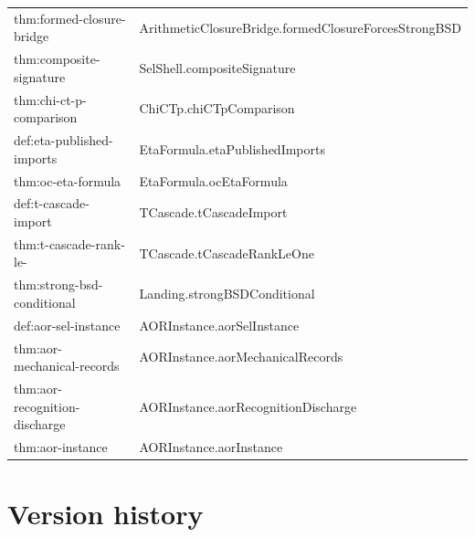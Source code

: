 \documentclass[11pt]{article}
\theoremstyle{definition}
\begin{document}
\begin{small}
\begin{longtable}{@{}>{\ttfamily\raggedright\arraybackslash}p{} >{\ttfamily\raggedright\arraybackslash}p{}@{}}
thm:\allowbreak formed-\allowbreak closure-\allowbreak bridge & Arithmetic\allowbreak Closure\allowbreak Bridge.\allowbreak formed\allowbreak Closure\allowbreak Forces\allowbreak Strong\allowbreak BSD \\
thm:\allowbreak composite-\allowbreak signature & Sel\allowbreak Shell.\allowbreak composite\allowbreak Signature \\
thm:\allowbreak chi-\allowbreak ct-\allowbreak p-\allowbreak comparison & Chi\allowbreak CTp.\allowbreak chi\allowbreak CTp\allowbreak Comparison \\
def:\allowbreak eta-\allowbreak published-\allowbreak imports & Eta\allowbreak Formula.\allowbreak eta\allowbreak Published\allowbreak Imports \\
thm:\allowbreak oc-\allowbreak eta-\allowbreak formula & Eta\allowbreak Formula.\allowbreak oc\allowbreak Eta\allowbreak Formula \\
def:\allowbreak t-\allowbreak cascade-\allowbreak import & TCascade.\allowbreak t\allowbreak Cascade\allowbreak Import \\
thm:\allowbreak t-\allowbreak cascade-\allowbreak rank-\allowbreak le-\allowbreak 1 & TCascade.\allowbreak t\allowbreak Cascade\allowbreak Rank\allowbreak Le\allowbreak One \\
thm:\allowbreak strong-\allowbreak bsd-\allowbreak conditional & Landing.\allowbreak strong\allowbreak BSDConditional \\
def:\allowbreak aor-\allowbreak sel-\allowbreak instance & AORInstance.\allowbreak aor\allowbreak Sel\allowbreak Instance \\
thm:\allowbreak aor-\allowbreak mechanical-\allowbreak records & AORInstance.\allowbreak aor\allowbreak Mechanical\allowbreak Records \\
thm:\allowbreak aor-\allowbreak recognition-\allowbreak discharge & AORInstance.\allowbreak aor\allowbreak Recognition\allowbreak Discharge \\
thm:\allowbreak aor-\allowbreak instance & AORInstance.\allowbreak aor\allowbreak Instance \\
\end{longtable}
\end{small}
 
\section{Version history}\label{app:version-history}
\end{document}

